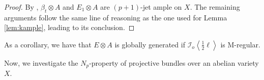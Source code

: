\documentclass[11pt,letter]{amsart}
\numberwithin{equation}{section}
\begin{document}
\begin{proof}
By \cite[Theorem 1.6]{Ito22}, $\beta_t\otimes A$ and $E_1\otimes A$ are $(p+1)$-jet ample on $X$. The remaining arguments follow the same line of reasoning as the one used for Lemma \ref{lem:kample}, leading to its conclusion.
\end{proof}
As a corollary, we have that $E\otimes A$ is globally generated if $
\mathcal{I}_o\left\langle \frac{1}{2}\ell\right\rangle
$ is M-regular. 

%
%
%
%
%
%


Now, we investigate the $N_p$-property of projective bundles over an abelian variety $X$. 
\end{document}
